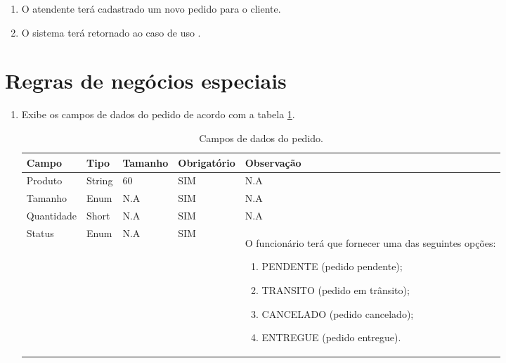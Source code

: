 \begin{enumerate}
	\item O atendente terá cadastrado um novo pedido para o cliente.
	\item O sistema terá retornado ao caso de uso .	
\end{enumerate}

\section{Regras de negócios especiais}

\begin{enumerate}[label=RN\arabic*]
	\item Exibe os campos de dados do pedido de acordo com a tabela \ref{uc007_tb_rn1}. \label{uc007_rn:1}
	\begin{table}[htb]
		\ABNTEXfontereduzida
		\caption[Campos de dados do pedido]{Campos de dados do pedido.}
		\label{uc007_tb_rn1}
		\begin{tabular}{|p{3.0cm}|p{2.0cm}|p{1.5cm}|p{2.0cm}|p{5.75cm}|}
			\hline
			\textbf{Campo} & \textbf{Tipo} & \textbf{Tamanho} & \textbf{Obrigatório} & \textbf{Observação}                                                                                                                                                  \\ \hline
			Produto        & String        & 60               & SIM                  & N.A                                                                                                                                                                  \\ \hline
			Tamanho        & Enum          & N.A              & SIM                  & N.A                                                                                                                                                                  \\ \hline
			Quantidade     & Short         & N.A              & SIM                  & N.A                                                                                                                                                                  \\ \hline
			Status         & Enum          & N.A              & SIM                  & O funcionário terá que fornecer uma das seguintes opções:  
			\begin{enumerate}
				\item PENDENTE (pedido pendente);
				\item TRANSITO (pedido em trânsito);
				\item CANCELADO (pedido cancelado);
				\item ENTREGUE (pedido entregue).
			\end{enumerate}\\ \hline
		\end{tabular}
	\end{table}
\end{enumerate}